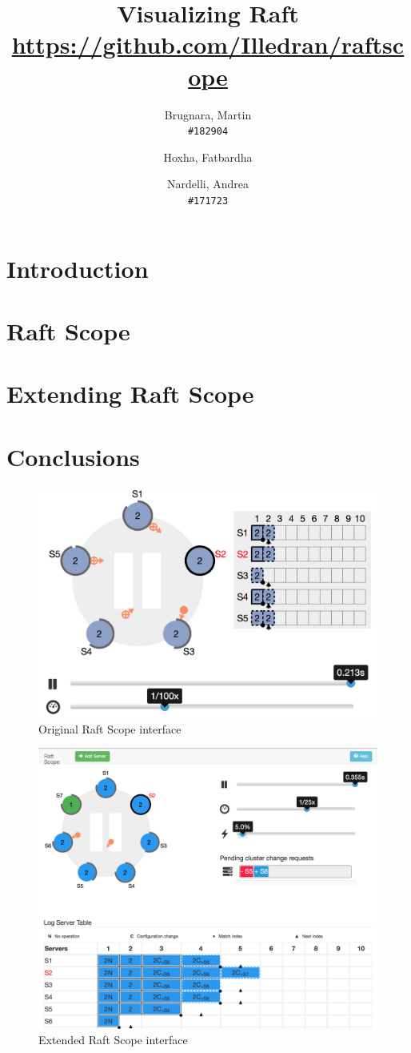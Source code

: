 \documentclass[11pt,a4paper]{proc}
\author{
  Brugnara, Martin\\
  \texttt{\#182904}
  \and
  Hoxha, Fatbardha\\
  \texttt{}
  \and
  Nardelli, Andrea\\
  \texttt{\#171723}
}
\title{Visualizing Raft\\\small{\url{https://github.com/Illedran/raftscope}}}
\begin{document}
\maketitle

\abstract{}


\section{Introduction}


\section{Raft Scope}


\section{Extending Raft Scope}


\section{Conclusions}





\newpage{}
\begin{figure}[h]
    \centering
    \caption{\huge{Original Raft Scope interface}}
    \includegraphics[width=0.65\linewidth]{org.png}
\end{figure}

\vfill{}

\begin{figure}[h]
    \centering
    \caption{\huge{Extended Raft Scope interface}}
    \includegraphics[width=0.9\linewidth]{our.png}
\end{figure}
\end{document}
